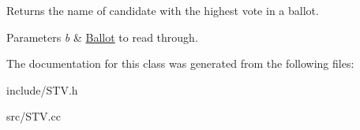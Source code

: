 Returns the name of candidate with the highest vote in a ballot. 


\begin{DoxyParams}{Parameters}
{\em b} & \hyperlink{class_ballot}{Ballot} to read through. \\
\hline
\end{DoxyParams}


The documentation for this class was generated from the following files\+:\begin{DoxyCompactItemize}
\item 
include/S\+T\+V.\+h\item 
src/S\+T\+V.\+cc\end{DoxyCompactItemize}
